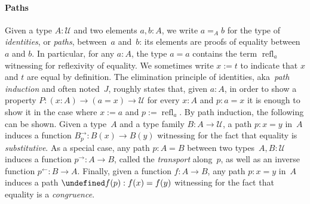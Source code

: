 \documentclass[10pt,a4paper]{amsart}
\theoremstyle{definition}
\newcommand{\defd}{:=} %
\newcommand{\refl}[1]{\operatorname{refl}_{#1}} %
\newcommand{\J}{\operatorname{J}} %
\newcommand{\transport}[1]{#1^\to} %
\newcommand{\transportinv}[1]{#1^\ot} %
\newcommand{\subst}[2]{#1^\to_{#2}} %
\let\cong\undefined
\newcommand{\cong}[1]{#1^=} %
\newcommand{\U}{\mathcal{U}} %
\newcommand{\pa}[1]{\left(#1\right)}
\newcommand{\ot}{\leftarrow}
\newcommand{\aka}{aka~}
\begin{document}
\paragraph{Paths}
Given a type $A:\U$ and two elements $a,b:A$, we write $a=_A b$ for the type of
\emph{identities}, or \emph{paths}, between~$a$ and~$b$: its elements are proofs
of equality between $a$ and $b$. In particular, for any $a:A$, the type $a=a$
contains the term $\refl{a}$ witnessing for reflexivity of
equality.
%
We sometimes write $x\defd t$ to indicate that $x$ and $t$ are equal by
definition.
%
The elimination principle of identities, \aka \emph{path induction} and often
noted~$J$, roughly states that, given $a:A$, in order to show a property
$P:(x:A)\to(a=x)\to\U$ for every $x:A$ and $p:a=x$ it is enough to show it in
the case where $x\defd a$ and $p\defd\refl{a}$.
%
%
By path induction, the following can be shown. Given a type~$A$ and a type
family $B:A\to\U$, a path $p:x=y$ in~$A$ induces a function
$\subst Bp:B(x)\to B(y)$ witnessing for the fact that equality is
\emph{substitutive}. As a special case, any path $p:A=B$ between two
types~$A,B:\U$ induces a function $\transport p:A\to B$, called the
\emph{transport} along~$p$, as well as an inverse function
$\transportinv p:B\to A$. Finally, given a function $f:A\to B$, any path $p:x=y$
in~$A$ induces a path $\cong f(p): f(x) = f(y)$ witnessing for the fact that
equality is a \emph{congruence}.
\end{document}

